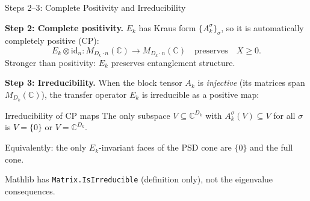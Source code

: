 \documentclass[aspectratio=169,10pt]{beamer}
\begin{document}
\begin{frame}{Steps 2--3: Complete Positivity and Irreducibility}

\textbf{Step 2: Complete positivity.}\quad
$E_k$ has Kraus form $\{A_k^\sigma\}_\sigma$, so it is automatically \alert{completely positive (CP)}:
\[
E_k \otimes \mathrm{id}_n : M_{D_k \cdot n}(\mathbb{C}) \to M_{D_k \cdot n}(\mathbb{C}) \quad\text{preserves}\quad X \geq 0.
\]
Stronger than positivity: $E_k$ preserves entanglement structure.

\vspace{0.6em}
\textbf{Step 3: Irreducibility.}\quad
When the block tensor $A_k$ is \emph{injective} (its matrices span $M_{D_k}(\mathbb{C})$), the transfer operator $E_k$ is \alert{irreducible} as a positive map:

\begin{block}{Irreducibility of CP maps}
The only subspace $V \subseteq \mathbb{C}^{D_k}$ with $A_k^\sigma(V) \subseteq V$ for all $\sigma$ is $V = \{0\}$ or $V = \mathbb{C}^{D_k}$.

Equivalently: the only $E_k$-invariant faces of the PSD cone are $\{0\}$ and the full cone.
\end{block}

\vspace{0.3em}
\textcolor{dimwhite}{\footnotesize Mathlib has \texttt{Matrix.IsIrreducible} (definition only), not the eigenvalue consequences.}
\end{frame}
\end{document}

